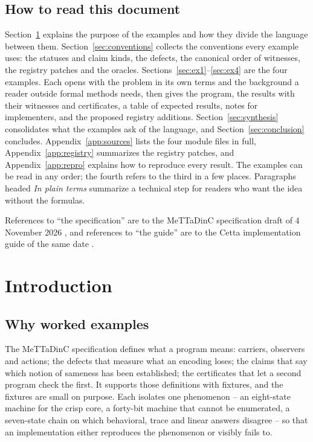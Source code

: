 \documentclass[11pt]{article}
\theoremstyle{definition}
\theoremstyle{plain}
\begin{document}
\subsection*{How to read this document}
Section~\ref{sec:intro} explains the purpose of the examples and how they divide the language
between them. Section~\ref{sec:conventions} collects the conventions every example uses: the
statuses and claim kinds, the defects, the canonical order of witnesses, the registry patches and
the oracles. Sections~\ref{sec:ex1}--\ref{sec:ex4} are the four examples. Each opens with the
problem in its own terms and the background a reader outside formal methods needs, then gives the
program, the results with their witnesses and certificates, a table of expected results, notes for
implementers, and the proposed registry additions. Section~\ref{sec:synthesis} consolidates what
the examples ask of the language, and Section~\ref{sec:conclusion} concludes. Appendix~\ref{app:sources}
lists the four module files in full, Appendix~\ref{app:registry} summarizes the registry patches, and
Appendix~\ref{app:repro} explains how to reproduce every result. The examples can be read in any
order; the fourth refers to the third in a few places. Paragraphs headed \emph{In plain terms}
summarize a technical step for readers who want the idea without the formulas.

References to ``the specification'' are to the MeTTaDinC specification draft of 4 November 2026
\cite{spec}, and references to ``the guide'' are to the Cetta implementation guide of the same date
\cite{guide}.

\tableofcontents
\clearpage
\section{Introduction}\label{sec:intro}

\subsection{Why worked examples}

The MeTTaDinC specification defines what a program means: carriers, observers and actions; the
defects that measure what an encoding loses; the claims that say which notion of sameness has
been established; the certificates that let a second program check the first. It supports those
definitions with fixtures, and the fixtures are small on purpose. Each isolates one phenomenon --
an eight-state machine for the crisp core, a forty-bit machine that cannot be enumerated, a
seven-state chain on which behavioral, trace and linear answers disagree -- so that an
implementation either reproduces the phenomenon or visibly fails to.
\end{document}
